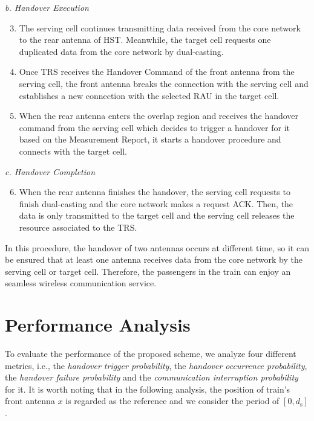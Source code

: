 \documentclass[a4paper,twocolumn,10pt]{IEEEtran}
\begin{document}
\emph{b. Handover Execution}

\begin{enumerate}
\setcounter{enumi}{2}
\item The serving cell continues transmitting data received from the core network to the rear antenna of HST. Meanwhile, the target cell requests one duplicated data from the core network by dual-casting.
\item Once TRS receives the Handover Command of the front antenna from the serving cell, the front antenna breaks the connection with the serving cell and establishes a new connection with the selected RAU in the target cell.
\item When the rear antenna enters the overlap region and receives the handover command from the serving cell which decides to trigger a handover for it based on the Measurement Report, it starts a handover procedure and connects with the target cell.

\end{enumerate}

\emph{c. Handover Completion}

\begin{enumerate}
\setcounter{enumi}{5}
\item When the rear antenna finishes the handover, the serving cell requests to finish dual-casting and the core network makes a request ACK. Then, the data is only transmitted to the target cell and the serving cell releases the resource associated to the TRS.
\end{enumerate}

In this procedure, the handover of two antennas occurs at different time, so it can be ensured that at least one antenna receives data from the core network by the serving cell or target cell. Therefore, the passengers in the train can enjoy an seamless wireless communication service.


\section{Performance Analysis}

To evaluate the performance of the proposed scheme, we analyze four different metrics, i.e., the \textit{handover trigger probability}, the \textit{handover occurrence probability}, the \textit{handover failure probability} and the \textit{communication interruption probability} for it. It is worth noting that in the following analysis, the position of train's front antenna $x$ is regarded as the reference and we consider the period of $\left[ {0,d_\textrm{s}} \right]$.
\end{document}
